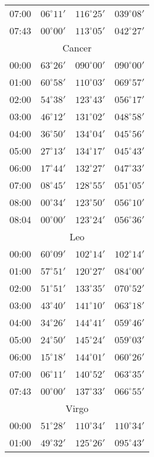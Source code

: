 \begin{table}
\begin{Parallel}{}{}
{{\begin{tabular}{l|lll}
07:00 & $06^\circ 11'$ & $116^\circ 25'$& $039^\circ 08'$ \\
07:43 & $00^\circ 00'$ & $113^\circ 05'$& $042^\circ 27'$ \\
\multicolumn{4}{c}{Cancer}\\
00:00 & $63^\circ 26'$ & $090^\circ 00'$& $090^\circ 00'$ \\
01:00 & $60^\circ 58'$ & $110^\circ 03'$& $069^\circ 57'$ \\
02:00 & $54^\circ 38'$ & $123^\circ 43'$& $056^\circ 17'$ \\
03:00 & $46^\circ 12'$ & $131^\circ 02'$& $048^\circ 58'$ \\
04:00 & $36^\circ 50'$ & $134^\circ 04'$& $045^\circ 56'$ \\
05:00 & $27^\circ 13'$ & $134^\circ 17'$& $045^\circ 43'$ \\
06:00 & $17^\circ 44'$ & $132^\circ 27'$& $047^\circ 33'$ \\
07:00 & $08^\circ 45'$ & $128^\circ 55'$& $051^\circ 05'$ \\
08:00 & $00^\circ 34'$ & $123^\circ 50'$& $056^\circ 10'$ \\
08:04 & $00^\circ 00'$ & $123^\circ 24'$& $056^\circ 36'$ \\
\multicolumn{4}{c}{Leo}\\
00:00 & $60^\circ 09'$ & $102^\circ 14'$& $102^\circ 14'$ \\
01:00 & $57^\circ 51'$ & $120^\circ 27'$& $084^\circ 00'$ \\
02:00 & $51^\circ 51'$ & $133^\circ 35'$& $070^\circ 52'$ \\
03:00 & $43^\circ 40'$ & $141^\circ 10'$& $063^\circ 18'$ \\
04:00 & $34^\circ 26'$ & $144^\circ 41'$& $059^\circ 46'$ \\
05:00 & $24^\circ 50'$ & $145^\circ 24'$& $059^\circ 03'$ \\
06:00 & $15^\circ 18'$ & $144^\circ 01'$& $060^\circ 26'$ \\
07:00 & $06^\circ 11'$ & $140^\circ 52'$& $063^\circ 35'$ \\
07:43 & $00^\circ 00'$ & $137^\circ 33'$& $066^\circ 55'$ \\
\multicolumn{4}{c}{Virgo}\\
00:00 & $51^\circ 28'$ & $110^\circ 34'$& $110^\circ 34'$ \\
01:00 & $49^\circ 32'$ & $125^\circ 26'$& $095^\circ 43'$ \\
\end{tabular}
}}
\ParallelRText{{\small
}}
\end{Parallel}
\end{table}

